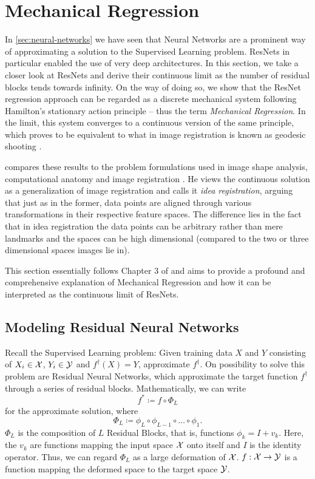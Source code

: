 \section{Mechanical Regression}

In \cref{sec:neural-networks} we have seen that Neural Networks are a prominent way of approximating a solution to the Supervised Learning problem.
ResNets in particular enabled the use of very deep architectures.
In this section, we take a closer look at ResNets and derive their continuous limit as the number of residual blocks tends towards infinity.
On the way of doing so, we show that the ResNet regression approach can be regarded as a discrete mechanical system following Hamilton's stationary action principle -- thus the term \emph{Mechanical Regression}.
In the limit, this system converges to a continuous version of the same principle, which proves to be equivalent to what in image registration is known as geodesic shooting \cite{allassonniere05}.

\citet{owhadi20} compares these results to the problem formulations used in image shape analysis, computational anatomy and image registration \cite{bibid}.
He views the continuous solution as a generalization of image registration and calls it \emph{idea registration}, arguing that just as in the former, data points are aligned through various transformations in their respective feature spaces.
The difference lies in the fact that in idea registration the data points can be arbitrary rather than mere landmarks and the spaces can be high dimensional (compared to the two or three dimensional spaces images lie in).

This section essentially follows Chapter 3 of \cite{owhadi20} and aims to provide a profound and comprehensive explanation of Mechanical Regression and how it can be interpreted as the continuous limit of ResNets.

\subsection{Modeling Residual Neural Networks}

Recall the Supervised Learning problem: Given training data $X$ and $Y$ consisting of $X_i \in \mathcal{X}$, $Y_i \in \mathcal{Y}$ and $f^\dagger(X) = Y$, approximate $f^\dagger$.
On possibility to solve this problem are Residual Neural Networks, which approximate the target function $f^\dagger$ through a series of residual blocks.
Mathematically, we can write
\begin{equation}
	f^\ast \coloneqq f \circ \Phi_L 
\end{equation}
for the approximate solution, where
\begin{equation}
\Phi_L \coloneqq \phi_L \circ \phi_{L-1} \circ \ldots \circ \phi_1.
\end{equation} 
$\Phi_L$ is the composition of $L$ Residual Blocks, that is, functions $\phi_k = I + v_k$.
Here, the $v_k$ are functions mapping the input space $\mathcal{X}$ onto itself and $I$ is the identity operator.
Thus, we can regard $\Phi_L$ as a large deformation of $\mathcal{X}$.
$f: \mathcal{X} \to \mathcal{Y}$ is a function mapping the deformed space to the target space $\mathcal{Y}$.

